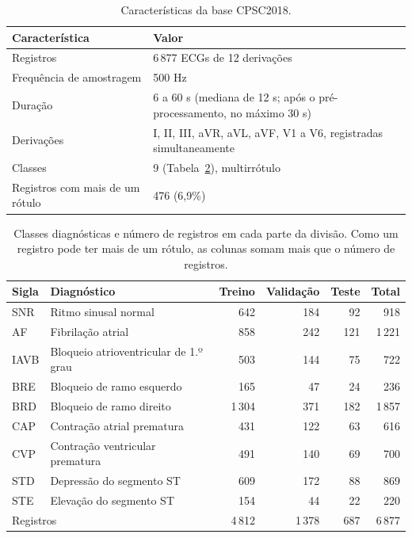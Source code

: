 \documentclass[11pt,a4paper]{article}
\newcommand{\fonte}[1]{\par\vspace{2pt}{\centering\footnotesize Fonte: #1\par}}
\begin{document}
\begin{table}[H]\centering\small
\caption{Características da base CPSC2018.}\label{tab:base}
\begin{tabular}{ll}
\toprule
\textbf{Característica} & \textbf{Valor} \\
\midrule
Registros & 6\,877 ECGs de 12 derivações \\
Frequência de amostragem & 500 Hz \\
Duração & 6 a 60 s (mediana de 12 s; após o pré-processamento, no máximo 30 s) \\
Derivações & I, II, III, aVR, aVL, aVF, V1 a V6, registradas simultaneamente \\
Classes & 9 (Tabela~\ref{tab:classes}), multirrótulo \\
Registros com mais de um rótulo & 476 (6,9\%) \\
\bottomrule
\end{tabular}
\fonte{Elaborado pelo autor, a partir dos dados do desafio PhysioNet/CinC 2020.}
\end{table}

\begin{table}[H]\centering\small
\caption{Classes diagnósticas e número de registros em cada parte da divisão. Como um registro pode ter mais de um rótulo, as colunas somam mais que o número de registros.}\label{tab:classes}
\begin{tabular}{llrrrr}
\toprule
\textbf{Sigla} & \textbf{Diagnóstico} & \textbf{Treino} & \textbf{Validação} & \textbf{Teste} & \textbf{Total} \\
\midrule
SNR & Ritmo sinusal normal & 642 & 184 & 92 & 918 \\
AF & Fibrilação atrial & 858 & 242 & 121 & 1\,221 \\
IAVB & Bloqueio atrioventricular de 1.º grau & 503 & 144 & 75 & 722 \\
BRE & Bloqueio de ramo esquerdo & 165 & 47 & 24 & 236 \\
BRD & Bloqueio de ramo direito & 1\,304 & 371 & 182 & 1\,857 \\
CAP & Contração atrial prematura & 431 & 122 & 63 & 616 \\
CVP & Contração ventricular prematura & 491 & 140 & 69 & 700 \\
STD & Depressão do segmento ST & 609 & 172 & 88 & 869 \\
STE & Elevação do segmento ST & 154 & 44 & 22 & 220 \\
\midrule
\multicolumn{2}{l}{Registros} & 4\,812 & 1\,378 & 687 & 6\,877 \\
\bottomrule
\end{tabular}
\fonte{Elaborado pelo autor.}
\end{table}
\end{document}
